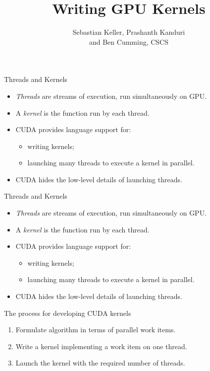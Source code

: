 \documentclass[aspectratio=43]{beamer}
\author{Sebastian Keller, Prashanth Kanduri\\ and Ben Cumming, CSCS}
\title{Writing GPU Kernels}
\subtitle{}
\begin{document}
\cscstitle


\begin{frame}[fragile]{Threads and Kernels}
    \begin{itemize}
        \item \emph{Threads} are streams of execution, run simultaneously on GPU.
        \item A \emph{kernel} is the function run by each thread.
        \item CUDA provides language support for:
        \begin{itemize}
            \item writing kernels;
            \item launching many threads to execute a kernel in parallel.
        \end{itemize}
        \item CUDA hides the low-level details of launching threads.
    \end{itemize}
\end{frame}

\begin{frame}[fragile]{Threads and Kernels}
    \begin{itemize}
        \item \emph{Threads} are streams of execution, run simultaneously on GPU.
        \item A \emph{kernel} is the function run by each thread.
        \item CUDA provides language support for:
        \begin{itemize}
            \item writing kernels;
            \item launching many threads to execute a kernel in parallel.
        \end{itemize}
        \item CUDA hides the low-level details of launching threads.
    \end{itemize}

    \begin{info}{The process for developing CUDA kernels}
        \begin{enumerate}
            \item Formulate algorithm in terms of parallel work items.
            \item Write a kernel implementing a work item on one thread.
            \item Launch the kernel with the required number of threads.
        \end{enumerate}
    \end{info}
\end{frame}
\end{document}
